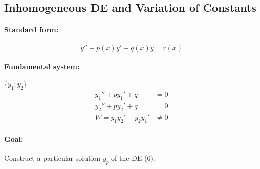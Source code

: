 \documentclass[]{article}
\begin{document}
\subsection{Inhomogeneous DE and Variation of Constants}
\paragraph{Standard form:} \begin{equation}
y''+p(x)y'+q(x)y=r(x)
\end{equation}
\paragraph{Fundamental system:} $ \{y_1;y_2\}$
\[\begin{split}
	y_1''+py_1'+q & =0 \\
	y_2''+py_2'+q & =0\\
	W=y_1y_2'-y_2y_1' &\not=0
\end{split}\]
\paragraph{Goal:} Construct a particular solution $y_p$ of the DE (6).
\end{document}
